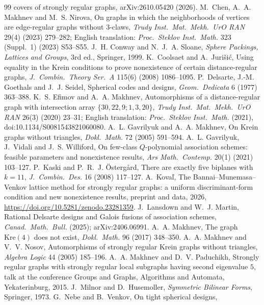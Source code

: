 \documentclass[11pt]{article}
\theoremstyle{definition}
\theoremstyle{remark}
\newcommand{\Kre}{\mathrm{Kre}}
\begin{document}
\begin{thebibliography}{99}
covers of strongly regular graphs, arXiv:2610.05420 (2026).
 M.~Chen, A.~A. Makhnev and M.~S. Nirova, On graphs in which the
neighborhoods of vertices are edge-regular graphs without $3$-claws,
\emph{Trudy Inst.\ Mat.\ Mekh.\ UrO RAN} 29(4) (2023) 279--282; English
translation: \emph{Proc.\ Steklov Inst.\ Math.} 323 (Suppl.~1) (2023)
S53--S55.
 J.~H. Conway and N.~J.~A. Sloane, \emph{Sphere Packings, Lattices
and Groups}, 3rd ed., Springer, 1999.
 K.~Coolsaet and A.~Juri\v si\'c, Using equality in the Krein
conditions to prove nonexistence of certain distance-regular graphs, \emph{J.\
Combin.\ Theory Ser.\ A} 115(6) (2008) 1086--1095.
 P.~Delsarte, J.-M. Goethals and J.~J. Seidel, Spherical codes and
designs, \emph{Geom.\ Dedicata} 6 (1977) 363--388.
 K.~S. Efimov and A.~A. Makhnev, Automorphisms of a
distance-regular graph with intersection array $\{30,22,9;1,3,20\}$,
\emph{Trudy Inst.\ Mat.\ Mekh.\ UrO RAN} 26(3) (2020) 23--31; English
translation: \emph{Proc.\ Steklov Inst.\ Math.} (2021),
doi:10.1134/S0081543821060080.
 A.~L. Gavrilyuk and A.~A. Makhnev, On Krein graphs without
triangles, \emph{Dokl.\ Math.} 72 (2005) 591--594.
 A.~L. Gavrilyuk, J.~Vidali and J.~S. Williford, On few-class
$Q$-polynomial association schemes: feasible parameters and nonexistence
results, \emph{Ars Math.\ Contemp.} 20(1) (2021) 103--127.
 P.~Kaski and P.~R.~J. \"Osterg\aa rd, There are exactly five
biplanes with $k=11$, \emph{J.\ Combin.\ Des.} 16 (2008) 117--127.
\bibitem{Koval} A.~Kova\v l, The Bannai--Munemasa--Venkov lattice method for
strongly regular graphs: a uniform discriminant-form condition and new
nonexistence results, preprint and data, 2026,
\url{https://doi.org/10.5281/zenodo.23281359}.
 J.~Lansdown and W.~J. Martin, Rational Delsarte designs and
Galois fusions of association schemes, \emph{Canad.\ Math.\ Bull.} (2025);
arXiv:2406.06991.
 A.~A. Makhnev, The graph $\Kre(4)$ does not exist,
\emph{Dokl.\ Math.} 96 (2017) 348--350.
 A.~A. Makhnev and V.~V. Nosov, Automorphisms of strongly regular
Krein graphs without triangles, \emph{Algebra Logic} 44 (2005) 185--196.
\bibitem{MP} A.~A. Makhnev and D.~V. Paduchikh, Strongly regular graphs with
strongly regular local subgraphs having second eigenvalue $5$, talk at the
conference Groups and Graphs, Algorithms and Automata, Yekaterinburg, 2015.
\bibitem{MH} J.~Milnor and D.~Husemoller, \emph{Symmetric Bilinear Forms},
Springer, 1973.
 G.~Nebe and B.~Venkov, On tight spherical designs,

\end{thebibliography}
\end{document}
